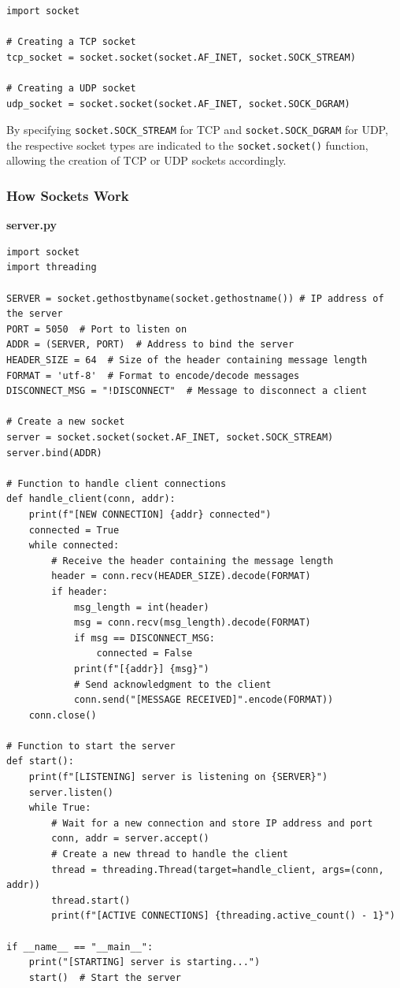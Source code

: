 \begin{codebox}
\begin{verbatim}
import socket

# Creating a TCP socket
tcp_socket = socket.socket(socket.AF_INET, socket.SOCK_STREAM)

# Creating a UDP socket
udp_socket = socket.socket(socket.AF_INET, socket.SOCK_DGRAM)
\end{verbatim}
\end{codebox}

By specifying \texttt{socket.SOCK\_STREAM} for TCP and \texttt{socket.SOCK\_DGRAM} for UDP, the respective socket types are indicated to the \texttt{socket.socket()} function, allowing the creation of TCP or UDP sockets accordingly.

\newpage
\subsubsection{How Sockets Work}
\textbf{server.py}
\begin{codebox}
\begin{verbatim}
import socket
import threading

SERVER = socket.gethostbyname(socket.gethostname()) # IP address of the server
PORT = 5050  # Port to listen on
ADDR = (SERVER, PORT)  # Address to bind the server
HEADER_SIZE = 64  # Size of the header containing message length
FORMAT = 'utf-8'  # Format to encode/decode messages
DISCONNECT_MSG = "!DISCONNECT"  # Message to disconnect a client

# Create a new socket
server = socket.socket(socket.AF_INET, socket.SOCK_STREAM)
server.bind(ADDR)

# Function to handle client connections
def handle_client(conn, addr):
    print(f"[NEW CONNECTION] {addr} connected")
    connected = True
    while connected:
        # Receive the header containing the message length
        header = conn.recv(HEADER_SIZE).decode(FORMAT)
        if header:
            msg_length = int(header)
            msg = conn.recv(msg_length).decode(FORMAT)
            if msg == DISCONNECT_MSG:
                connected = False
            print(f"[{addr}] {msg}")
            # Send acknowledgment to the client
            conn.send("[MESSAGE RECEIVED]".encode(FORMAT))
    conn.close()

# Function to start the server
def start():
    print(f"[LISTENING] server is listening on {SERVER}")
    server.listen()
    while True:
        # Wait for a new connection and store IP address and port
        conn, addr = server.accept()
        # Create a new thread to handle the client
        thread = threading.Thread(target=handle_client, args=(conn, addr))
        thread.start()
        print(f"[ACTIVE CONNECTIONS] {threading.active_count() - 1}")

if __name__ == "__main__":
    print("[STARTING] server is starting...")
    start()  # Start the server
\end{verbatim}
\end{codebox}

